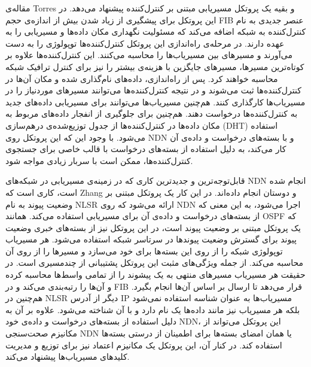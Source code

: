 مقاله‌ی Torres و بقیه \cite{controller} یک پروتکل مسیریابی مبتنی بر کنترل‌کننده پیشنهاد می‌دهد. در این پروتکل برای پیشگیری از زیاد شدن بیش از اندازه‌ی حجم FIB عنصر جدیدی به نام کنترل‌کننده به شبکه اضافه می‌کند که مسئولیت نگهداری مکان داده‌ها و مسیریابی را به عهده دارند. در مرحله‌ی راه‌اندازی این پروتکل کنترل‌کننده‌ها توپولوژی را به دست می‌آورند و مسیرهای بین مسیریاب‌ها را محاسبه می‌کنند. این کنترل‌کننده‌ها علاوه بر کوتاه‌ترین مسیرها، مسیر‌های جایگزین با هزینه‌ی بیشتر را نیز برای کنترل ترافیک شبکه محاسبه خواهند کرد. پس از راه‌اندازی، داده‌های نام‌گذاری شده و مکان آن‌ها در کنترل‌کننده‌ها ثبت می‌شوند و در نتیجه کنترل‌کننده‌ها می‌توانند مسیرهای موردنیاز را در مسیریاب‌ها کارگذاری کنند. هم‌چنین مسیریاب‌ها می‌توانند برای مسیریابی داده‌های جدید به کنترل‌کننده‌ها درخواست دهند. هم‌چنین برای جلوگیری از انفجار داده‌های مربوط به مکان داده‌ها در کنترل‌کننده‌ها از جدول توزیع‌شده‌ی درهم‌سازی  (DHT) استفاده می‌شود. با وجود این که این پروتکل روی NDN و با بسته‌های درخواست و داده‌ی آن کار می‌کند، به دلیل استفاده از بسته‌های درخواست با قالب خاصی برای جستجوی کنترل‌کننده‌ها، ممکن است با سربار زیادی مواجه شود. 

قابل‌توجه‌ترین و جدیدترین کاری که در زمینه‌ی مسیریابی در شبکه‌های NDN انجام شده است، کاری است که Zhang و دوستان \cite{nlsr} انجام داده‌اند. در این کار یک پروتکل مبتنی بر وضعیت پیوند به نام NLSR ارائه می‌شود که روی NDN اجرا می‌شود، به این معنی که از بسته‌های درخواست و داده‌ی آن برای مسیریابی استفاده می‌کند. همانند OSPF که یک پروتکل مبتنی بر وضعیت پیوند است، در این پروتکل نیز از بسته‌های خبری وضعیت پیوند برای گسترش وضعیت پیوندها در سرتاسر شبکه استفاده می‌‌شود. هر مسیریاب توپولوژی شبکه را از روی این بسته‌ها برای خود می‌سازد و مسیرها را از روی آن محاسبه می‌کند. از جمله ویژگی‌های مثبت این پروتکل پشتیبانی از چندمسیری است. در حقیقت هر مسیریاب مسیرهای منتهی به یک پیشوند را از تمامی واسط‌ها محاسبه کرده و آن‌ها را رتبه‌بندی می‌کند و در FIB قرار می‌دهد تا ارسال بر اساس آن‌ها انجام بگیرد. هم‌چنین در NLSR دیگر از آدرس IP مسیریاب‌ها به عنوان شناسه استفاده نمی‌شود بلکه هر مسیریاب نیز مانند داده‌ها یک نام دارد و با آن شناخته می‌شود. علاوه بر آن به دلیل استفاده از بسته‌های درخواست و داده‌ی خود NDN، این پروتکل می‌تواند از مکانیزم صحت‌سنجی NDN یا همان امضای بسته‌ها برای اطمینان از درستی بسته‌ها استفاده کند. در کنار آن، این پروتکل یک مکانیزم اعتماد نیز برای توزیع و مدیریت کلید‌های مسیریاب‌ها پیشنهاد می‌کند.

